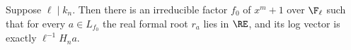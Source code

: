 Suppose $\ell\mid k_n$. Then there is an irreducible factor $f_0$ of $x^m+1$ over $\F_\ell$ such that for every $a\in L_{f_0}$ the real formal root $r_a$ lies in $\RE$, and its log vector is exactly $\ell^{-1}H_na$.
